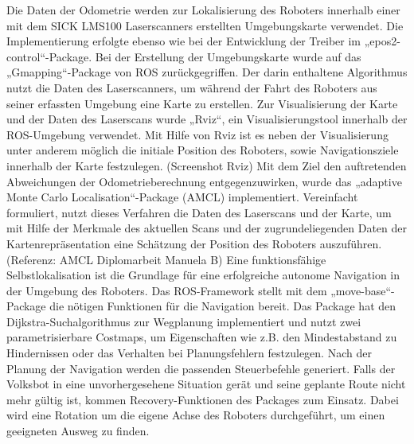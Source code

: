 

Die Daten der Odometrie werden zur Lokalisierung des Roboters innerhalb einer mit dem SICK LMS100 Laserscanners erstellten Umgebungskarte verwendet. Die Implementierung erfolgte ebenso wie bei der Entwicklung der Treiber im „epos2-control“-Package. Bei der Erstellung der Umgebungskarte wurde auf das „Gmapping“-Package von ROS zurückgegriffen. Der darin enthaltene Algorithmus nutzt die Daten des Laserscanners, um während der Fahrt des Roboters aus seiner erfassten Umgebung eine Karte zu erstellen. Zur Visualisierung der Karte und der Daten des Laserscans wurde „Rviz“, ein Visualisierungstool innerhalb der ROS-Umgebung verwendet. Mit Hilfe von Rviz ist es neben der Visualisierung unter anderem möglich die initiale Position des Roboters, sowie Navigationsziele innerhalb der Karte festzulegen. (Screenshot Rviz) Mit dem Ziel den auftretenden Abweichungen der Odometrieberechnung entgegenzuwirken, wurde das „adaptive Monte Carlo Localisation“-Package (AMCL) implementiert. Vereinfacht formuliert, nutzt dieses Verfahren die Daten des Laserscans und der Karte, um mit Hilfe der Merkmale des aktuellen Scans und der zugrundeliegenden Daten der Kartenrepräsentation eine Schätzung der Position des Roboters auszuführen. (Referenz: AMCL Diplomarbeit Manuela B)
Eine funktionsfähige Selbstlokalisation ist die Grundlage für eine erfolgreiche autonome Navigation in der Umgebung des Roboters. Das ROS-Framework stellt mit dem „move-base“-Package die nötigen Funktionen für die Navigation bereit. Das Package hat den Dijkstra-Suchalgorithmus zur Wegplanung implementiert und nutzt zwei parametrisierbare Costmaps, um Eigenschaften wie z.B. den Mindestabstand zu Hindernissen oder das Verhalten bei Planungsfehlern festzulegen. Nach der Planung der Navigation werden die passenden Steuerbefehle generiert. Falls der Volksbot in eine unvorhergesehene Situation gerät und seine geplante Route nicht mehr gültig ist, kommen Recovery-Funktionen des Packages zum Einsatz. Dabei wird eine Rotation um die eigene Achse des Roboters durchgeführt, um einen geeigneten Ausweg zu finden. 

